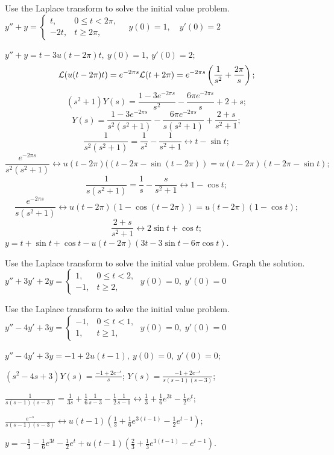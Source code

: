 \documentclass{ximera}
\begin{document}
\begin{problem}\label{exer:8.5.12} Use the Laplace transform to solve the initial value problem.
$y''+y=\left\{\begin{array}{cl} t,&0\le
t<2\pi,\\-2t,&t\ge 2\pi,\end{array}\right.\quad y(0)=1,\quad y'(0)=2$

\begin{solution}
$y''+y=t-3u(t-2\pi)t,\ y(0)=1,\ y'(0)=2;$
$$
{\cal L}(u(t-2\pi)t)=e^{-2\pi s}{\cal L}(t+2\pi)=e^{-2\pi s}
\left(\frac{1}{s^2}+\frac{2\pi}{s}\right);
$$
$$
(s^2+1)Y(s)=\frac{1-3e^{-2\pi s}}{s^2}-\frac{6\pi e^{-2\pi s}}{s}+2+s;
$$
$$
Y(s)=\frac{1-3e^{-2\pi s}}{s^2(s^2+1)}-\frac{6\pi e^{-2\pi s}}{s(s^2+1)}
+\frac{2+s}{s^2+1};
$$
$$
\frac{1}{s^2(s^2+1)}=\frac{1}{s^2}-\frac{1}{s^2+1}\leftrightarrow
t-\sin t;
$$
$$
\frac{e^{-2\pi s}}{s^2(s^2+1)}\leftrightarrow
u(t-2\pi)((t-2\pi-\sin(t-2\pi))=u(t-2\pi)(t-2\pi-\sin t);
$$
$$
\frac{1}{s(s^2+1)}=\frac{1}{s}-\frac{s}{s^2+1}\leftrightarrow
1-\cos t;
$$
$$
\frac{e^{-2\pi s}}{s(s^2+1)}\leftrightarrow u(t-2\pi)
(1-\cos(t-2\pi))=u(t-2\pi)(1-\cos t);
$$
$$
\frac{2+s}{s^2+1}\leftrightarrow 2\sin t+\cos t;
$$
$y=t+\sin t+\cos t-u(t-2\pi)(3t-3\sin t-6\pi\cos t)$.
\end{solution}
\end{problem}

\begin{problem}\label{exer:8.5.13} Use the Laplace transform to solve the initial value problem.  Graph the solution.
$y''+3y'+2y=\left\{\begin{array}{cl}1,&0\le
t<2,\\-1,&t\ge 2,\end{array}\right.\;  y(0)=0,\;  y'(0)=0$
\end{problem}

\begin{problem}\label{exer:8.5.14} Use the Laplace transform to solve the initial value problem.
$y''-4y'+3y=\left\{\begin{array}{cl}-1,&0\le
t<1,\\1,&t\ge 1,\end{array}\right.\;  y(0)=0,\;  y'(0)=0$

\begin{solution}
$y''-4y'+3y=-1+2u(t-1),\ y(0)=0,\ y'(0)=0$;

$(s^2-4s+3)Y(s)=\frac{-1+2e^{-s}}{s}$;
$Y(s)=\frac{-1+2e^{-s}}{s(s-1)(s-3)}$;

$\frac{1}{s(s-1)(s-3)}=\frac{1}{3s}+\frac{1}{6}\frac{1}{s-3}-\frac{1}{2}\frac{1}{s-1}
\leftrightarrow \frac{1}{3}+\frac{1}{6}e^{3t}-\frac{1}{2}e^t$;

$\frac{e^{-s}}{s(s-1)(s-3)}
\leftrightarrow u(t-1)\left(
\frac{1}{3}+\frac{1}{6}e^{3(t-1)}-\frac{1}{2}e^{t-1}\right)$;

$y=-\frac{1}{3}-\frac{1}{6}e^{3t}
-\frac{1}{2}e^t+u(t-1)\left(\frac{2}{3}+\frac{1}{3}e^{3(t-1)}
-e^{t-1}\right)$.
\end{solution}
\end{problem}
\end{document}
